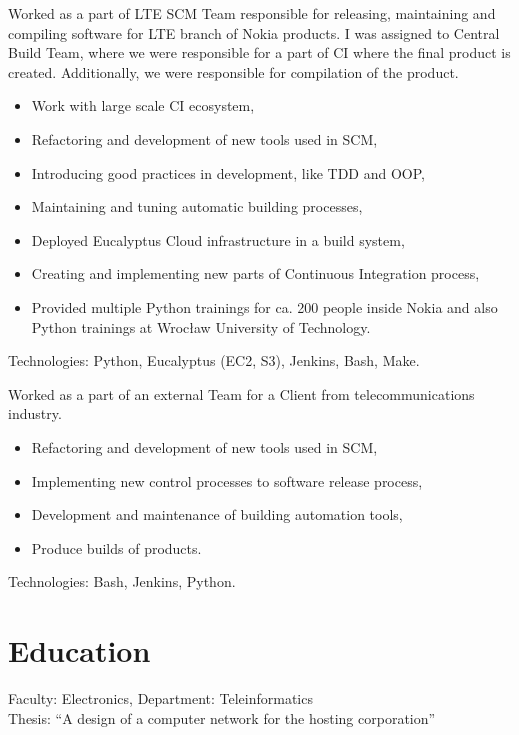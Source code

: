 \documentclass[11pt,a4paper,sans]{moderncv}
\newcommand{\newpara}{
        \vskip 0.2cm
    }
\begin{document}
%
    {}{}{
Worked as a part of LTE SCM Team responsible for releasing, maintaining and compiling software for LTE branch of Nokia
products. I was assigned to Central Build Team, where we were responsible for a
part of CI where the final product is created. Additionally, we were responsible for
compilation of the product.
\begin{itemize}
    \item Work with large scale CI ecosystem,
    \item Refactoring and development of new tools used in SCM,
    \item Introducing good practices in development, like TDD and OOP,
    \item Maintaining and tuning automatic building processes,
    \item Deployed Eucalyptus Cloud infrastructure in a build system,
    \item Creating and implementing new parts of Continuous Integration process,
    \item Provided multiple Python trainings for ca. 200 people inside Nokia and also Python trainings at Wrocław University of Technology.
\end{itemize}
\newpara
Technologies: Python, Eucalyptus (EC2, S3), Jenkins, Bash, Make.
}

%
    {}{}{
        Worked as a part of an external Team for a Client from telecommunications industry.
\begin{itemize}
    \item Refactoring and development of new tools used in SCM,
    \item Implementing new control processes to software release process,
    \item Development and maintenance of building automation tools,
    \item Produce builds of products.
\end{itemize}
\newpara
Technologies: Bash, Jenkins, Python.
}

\section{Education}
%
    {Faculty: Electronics, Department: Teleinformatics \\
    Thesis: “A design of a computer network for the hosting corporation”}
\end{document}
